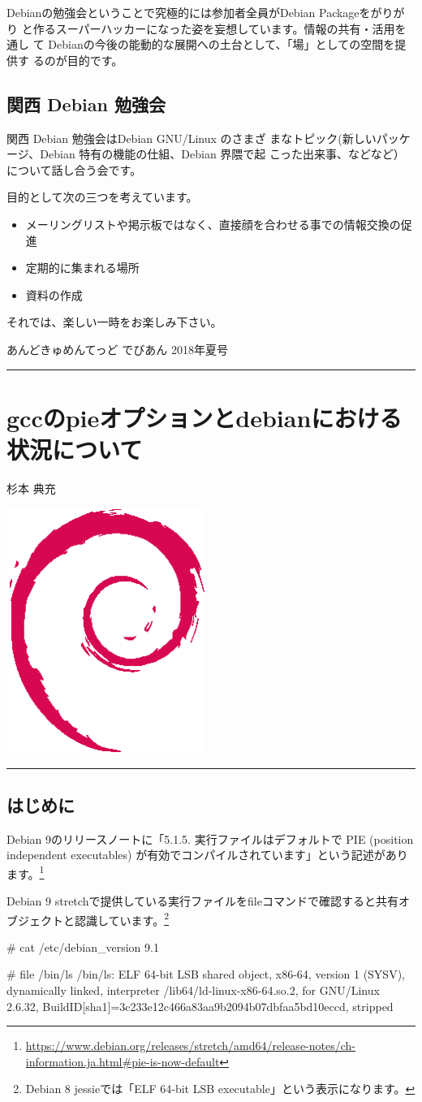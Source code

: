 \documentclass[mingoth,a4paper]{jsarticle}
\renewcommand{\dancersection}[2]{%
\newpage
あんどきゅめんてっど でびあん 2018年夏号
%
\vspace{0.1mm}\\
{\color{dancerdarkblue}\rule{\hsize}{2mm}}

%
%
\begin{minipage}[t]{0.6\hsize}
\color{dancerdarkblue}
\vspace{1cm}
\section{#1}
\hfill{}#2\\
\end{minipage}
\begin{minipage}[t]{0.4\hsize}
\vspace{-2cm}
\hfill{}\includegraphics[height=8cm]{image200502/openlogo-nd.eps}\\
\vspace{-5cm}
\end{minipage}
%
{\color{dancerlightblue}\rule{0.66\hsize}{2mm}}
%
\vspace{2cm}
}
\begin{document}
 Debianの勉強会ということで究極的には参加者全員がDebian Packageをがりがり
 と作るスーパーハッカーになった姿を妄想しています。情報の共有・活用を通し
 て Debianの今後の能動的な展開への土台として、「場」としての空間を提供す
 るのが目的です。

\subsection{関西 Debian 勉強会}

 関西 Debian 勉強会はDebian GNU/Linux のさまざ
 まなトピック(新しいパッケージ、Debian 特有の機能の仕組、Debian 界隈で起
 こった出来事、などなど）について話し合う会です。

 目的として次の三つを考えています。
 \begin{itemize}
  \item メーリングリストや掲示板ではなく、直接顔を合わせる事での情報交換の促進
  \item 定期的に集まれる場所
  \item 資料の作成
 \end{itemize}

 それでは、楽しい一時をお楽しみ下さい。

\dancersection{gccのpieオプションとdebianにおける状況について}{杉本 典充}

\subsection{はじめに}

Debian 9のリリースノートに「5.1.5. 実行ファイルはデフォルトで PIE (position independent executables) が有効でコンパイルされています」という記述があります。\footnote{\url{https://www.debian.org/releases/stretch/amd64/release-notes/ch-information.ja.html\#pie-is-now-default}}

Debian 9 stretchで提供している実行ファイルをfileコマンドで確認すると共有オブジェクトと認識しています。\footnote{Debian 8 jessieでは「ELF 64-bit LSB executable」という表示になります。}

\begin{commandline}
# cat /etc/debian_version
9.1

# file /bin/ls
/bin/ls: ELF 64-bit LSB shared object, x86-64, version 1 (SYSV), dynamically linked,
interpreter /lib64/ld-linux-x86-64.so.2, for GNU/Linux 2.6.32,
BuildID[sha1]=3c233e12c466a83aa9b2094b07dbfaa5bd10eccd, stripped
\end{commandline}
\end{document}
